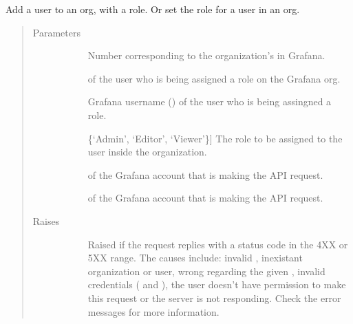 \documentclass[letterpaper,10pt,english]{sphinxmanual}
\begin{document}
\begin{fulllineitems}
\label{\detokenize{grafanaAPI:grafanaAPI.setUserRoleOrg}}
Add a user to an org, with a role. Or set the role for a user in an org.
\begin{quote}\begin{description}
\item[{Parameters}] \leavevmode\begin{description}
\item[{}] \leavevmode{[}\sphinxtitleref{int}{]}
Number corresponding to the organization’s  in Grafana.

\item[{}] \leavevmode{[}\sphinxtitleref{int}{]}
 of the user who is being assigned a role on the Grafana org.

\item[{}] \leavevmode{[}\sphinxtitleref{str}{]}
Grafana username () of the user who is being assingned a role.

\item[{}] \leavevmode{[}\{‘Admin’, ‘Editor’, ‘Viewer’\}{]}
The role to be assigned to the user inside the organization.

\item[{}] \leavevmode{[}\sphinxtitleref{str}{]}
 of the Grafana account that is making the API request.

\item[{}] \leavevmode{[}\sphinxtitleref{str}{]}
 of the Grafana account that is making the API request.

\end{description}

\item[{Raises}] \leavevmode\begin{description}
\item[{}] \leavevmode
Raised if the request replies with a status code in the 4XX or 5XX range.
The causes include: invalid , inexistant organization or user, 
wrong  regarding the given , invalid credentials ( and
), the user doesn’t have permission to make this request or the
server is not responding. Check the error messages for more information.


\end{description}
\end{description}
\end{quote}
\end{fulllineitems}
\end{document}
